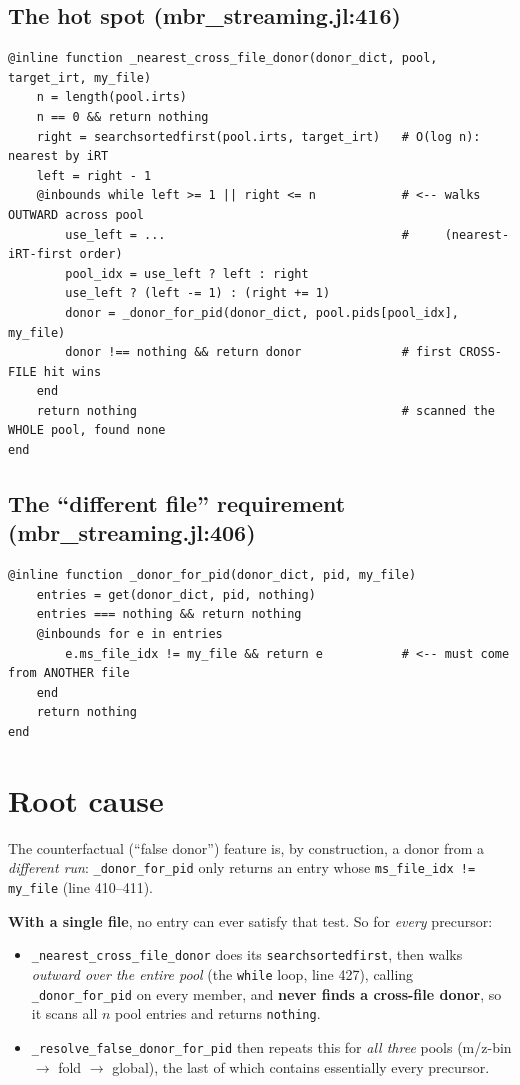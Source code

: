 \documentclass[11pt]{article}
\begin{document}
\subsection{The hot spot (mbr\_streaming.jl:416)}

\begin{lstlisting}[firstnumber=416]
@inline function _nearest_cross_file_donor(donor_dict, pool, target_irt, my_file)
    n = length(pool.irts)
    n == 0 && return nothing
    right = searchsortedfirst(pool.irts, target_irt)   # O(log n): nearest by iRT
    left = right - 1
    @inbounds while left >= 1 || right <= n            # <-- walks OUTWARD across pool
        use_left = ...                                 #     (nearest-iRT-first order)
        pool_idx = use_left ? left : right
        use_left ? (left -= 1) : (right += 1)
        donor = _donor_for_pid(donor_dict, pool.pids[pool_idx], my_file)
        donor !== nothing && return donor              # first CROSS-FILE hit wins
    end
    return nothing                                     # scanned the WHOLE pool, found none
end
\end{lstlisting}

\subsection{The ``different file'' requirement (mbr\_streaming.jl:406)}

\begin{lstlisting}[firstnumber=406]
@inline function _donor_for_pid(donor_dict, pid, my_file)
    entries = get(donor_dict, pid, nothing)
    entries === nothing && return nothing
    @inbounds for e in entries
        e.ms_file_idx != my_file && return e           # <-- must come from ANOTHER file
    end
    return nothing
end
\end{lstlisting}

\section{Root cause}

The counterfactual (``false donor'') feature is, by construction, a donor from a
\emph{different run}: \texttt{\_donor\_for\_pid} only returns an entry whose
\texttt{ms\_file\_idx != my\_file} (line 410--411).

\medskip
\noindent\textbf{With a single file}, no entry can ever satisfy that test. So for
\emph{every} precursor:
\begin{itemize}
\item \texttt{\_nearest\_cross\_file\_donor} does its \texttt{searchsortedfirst}, then
walks \emph{outward over the entire pool} (the \texttt{while} loop, line 427),
calling \texttt{\_donor\_for\_pid} on every member, and \textbf{never finds a
cross-file donor}, so it scans all $n$ pool entries and returns \texttt{nothing}.
\item \texttt{\_resolve\_false\_donor\_for\_pid} then repeats this for \emph{all three}
pools (m/z-bin $\to$ fold $\to$ global), the last of which contains essentially
every precursor.
\end{itemize}
\end{document}

